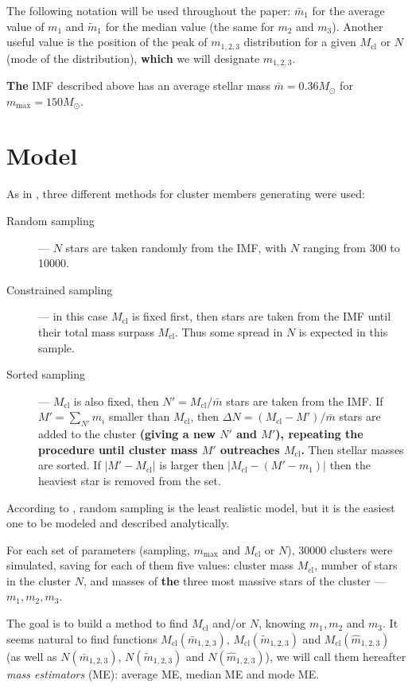 \documentclass{aastex}
\newcommand{\MSun}{M_\odot}
\newcommand{\Mmax}{m_{\mathrm{max}}}
\newcommand{\Mcl}{M_{\mathrm{cl}}}
\begin{document}
The following notation will be used throughout the paper: $\bar{m}_1$ for the average value of $m_1$ and $\tilde{m}_1$ for the median value (the same for $m_2$ and $m_3$). Another useful value is  the position of the peak of $m_{1,2,3}$ distribution for a given $\Mcl$ or $N$ (mode of the distribution), \textbf{which} we will designate $\hat{m}_{1,2,3}$.

\textbf{The} IMF described above has an average stellar mass $\bar{m} = 0.36 \MSun$ for $\Mmax = 150 \MSun$.

\section{Model}\label{sec:model}

As in \citep{Origin}, three different methods for cluster members generating were used:
\begin{description}
 \item[Random sampling] --- $N$ stars are taken randomly from the IMF, with $N$ ranging from 300 to 10000.
 \item[Constrained sampling] --- in this case $\Mcl$ is fixed first, then stars are taken from the IMF until their total mass surpass $\Mcl$. Thus some spread in $N$ is expected in this sample.
 \item[Sorted sampling] --- $\Mcl$ is also fixed, then $N' = \Mcl/\bar{m}$ stars are taken from the IMF. If $M' = \sum_{N'} m_i$ smaller than $\Mcl$, then $\Delta N = (\Mcl - M')/\bar{m}$ stars are added to the cluster \textbf{(giving a new $N'$ and $M'$), repeating the procedure until cluster mass $M'$ outreaches $\Mcl$.} Then stellar masses are sorted. If $|M' - \Mcl|$ is larger then $\left|\Mcl - (M'-m_{1})\right|$ then the heaviest star is removed from the set. 
\end{description}

According to \citep{Origin}, random sampling is the least realistic model, but it is the easiest one to be modeled and described analytically.

For each set of parameters (sampling, $\Mmax$ and $\Mcl$ or $N$), 30000 clusters were simulated, saving for each of them five values: cluster mass $\Mcl$,
number of stars in the cluster $N$, and masses of \textbf{the} three most massive stars of the cluster --- $m_1, m_2, m_3$.

The goal is to build a method to find $\Mcl$ and/or $N$, knowing $m_1, m_2$ and $m_3$.
It seems natural to find functions $\Mcl(\bar{m}_{1,2,3})$, $\Mcl(\tilde{m}_{1,2,3})$ and $\Mcl(\hat{m}_{1,2,3})$ (as well as $N(\bar{m}_{1,2,3})$, $N(\tilde{m}_{1,2,3})$ and $N(\hat{m}_{1,2,3})$), we will call them hereafter \textit{mass estimators} (ME): average ME, median ME and mode ME. 
\end{document}

